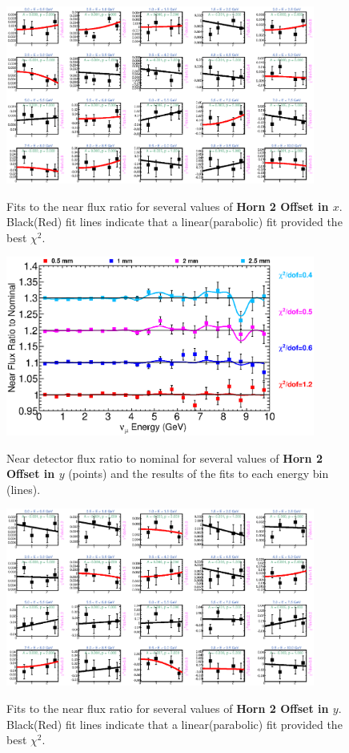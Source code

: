 \begin{figure}[hb]
  \begin{center}
    {\includegraphics[width=4.0in]{figures/Horn2XOffset_near_fits.eps}}
  \end{center}
\caption{ Fits to the near flux ratio for several values of {\bf Horn 2 Offset in $x$}. Black(Red) fit lines indicate that a linear(parabolic) fit provided the best $\chi^2$. }
\end{figure}

\begin{figure}[ht]
  \begin{center}
    {\includegraphics[width=4.0in]{figures/Horn2YOffset_near_summary.eps}}
  \end{center}
\caption{ Near detector flux ratio to nominal for several values of {\bf Horn 2 Offset in $y$} (points) and the results of the fits to each energy bin (lines).}
\end{figure}

\begin{figure}[hb]
  \begin{center}
    {\includegraphics[width=4.0in]{figures/Horn2YOffset_near_fits.eps}}
  \end{center}
\caption{ Fits to the near flux ratio for several values of {\bf Horn 2 Offset in $y$}. Black(Red) fit lines indicate that a linear(parabolic) fit provided the best $\chi^2$. }
\end{figure}



